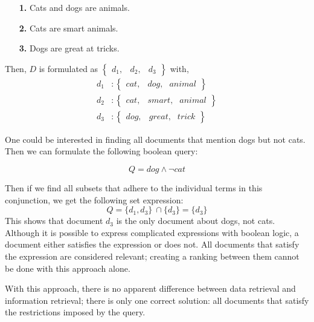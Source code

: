 \begin{itemize}
	\item[\textbf{1.}] Cats and dogs are animals.
	\item[\textbf{2.}] Cats are smart animals.
	\item[\textbf{3.}] Dogs are great at tricks. 
\end{itemize}
Then, $D$ is formulated as $\left\{
\begin{smallmatrix}
	d_1, & d_2, & d_3 
\end{smallmatrix}
\right\}$ with,
\begin{align}
	d_1&: \begin{Bmatrix}
		\mathit{cat}, & \textit{dog}, & \textit{animal}
	\end{Bmatrix}\\
	d_2&: \begin{Bmatrix}
		\mathit{cat}, & \textit{smart}, & \textit{animal}
	\end{Bmatrix}\\
	d_3&: \begin{Bmatrix}
		\mathit{dog}, & \textit{great}, & \textit{trick}
	\end{Bmatrix}
\end{align}

One could be interested in finding all documents that mention dogs but not cats. Then we can formulate the following boolean query:

\begin{equation}
	Q = \mathit{dog} \land \neg \mathit{cat}
\end{equation}

Then if we find all subsets that adhere to the individual terms in this conjunction, we get the following set expression:
\begin{equation}
	Q = \{d_1, d_3\}\ \cap \{d_3\} = \{d_3\}
\end{equation}
This shows that document $d_3$ is the only document about dogs, not cats. Although it is possible to express complicated expressions with boolean logic, a document either satisfies the expression or does not. All documents that satisfy the expression are considered relevant; creating a ranking between them cannot be done with this approach alone. 

With this approach, there is no apparent difference between data retrieval and information retrieval; there is only one correct solution: all documents that satisfy the restrictions imposed by the query. 

